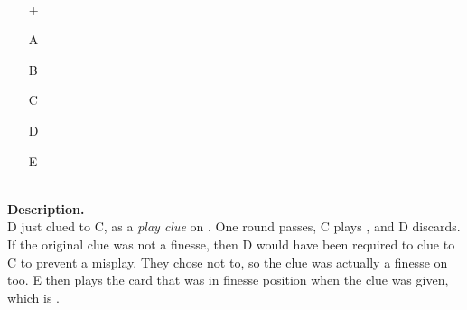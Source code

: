 \begin{example}	\hfill \\
	\begin{minipage}{0.45\textwidth}
		\begin{itemize}
			\item[\Large +]      
			\item[\Large A]    
			\item[\Large B]    
			\item[\Large C]    
			\item[\Large D]    
			\item[\Large E]    
		\end{itemize}
	\end{minipage}%
	\begin{minipage}{0.55\textwidth}
		\hfill \\
		
		\textbf{Description.} \\
		
		D just clued  to C, as a \emph{play clue} on . One round passes, C plays , and D discards. If the original  clue was not a finesse, then D would have been required to clue  to C to prevent a misplay. They chose not to, so the clue was actually a finesse on  too. E then plays the card that was in finesse position when the  clue was given, which is .
	\end{minipage}
\end{example} \vspace{0.15 cm}

